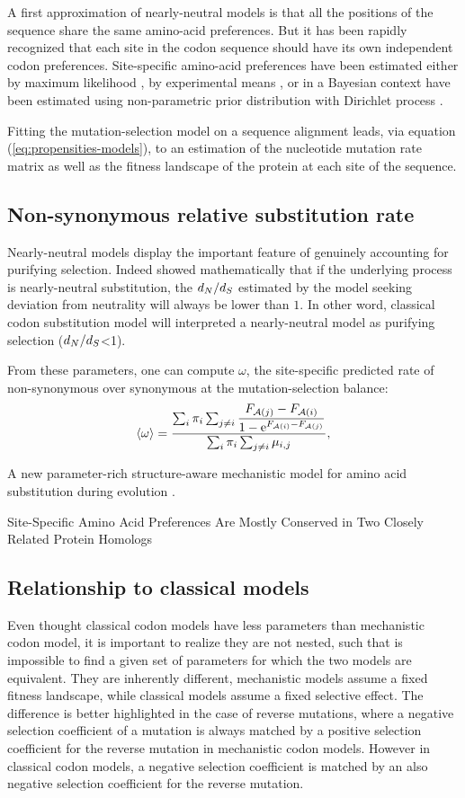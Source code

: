 A first approximation of nearly-neutral models is that all the positions of the sequence share the same amino-acid preferences.
But it has been rapidly recognized that each site in the codon sequence should have its own independent codon preferences.
Site-specific amino-acid preferences have been estimated either by maximum likelihood \citep{Tamuri2012,Tamuri2014}, by experimental means \citep{Bloom2017}, or in a Bayesian context have been estimated using non-parametric
prior distribution with Dirichlet process \citep{Rodrigue2010, Rodrigue2014}.

Fitting the mutation-selection model on a sequence alignment leads, via equation (\ref{eq:propensities-models}), to an estimation of the nucleotide mutation rate matrix as well as the fitness landscape of the protein at each site of the sequence.

\subsection{Non-synonymous relative {substitution} rate}
Nearly-neutral models display the important feature of genuinely accounting for purifying selection.
Indeed \citet{Spielman2015} showed mathematically that if the underlying process is nearly-neutral substitution, the $d_N / d_S$ estimated by the model seeking deviation from neutrality will always be lower than $1$.
In other word, classical codon substitution model will interpreted a nearly-neutral model as purifying selection ($d_N / d_S$<1).

From these parameters, one can compute $\omega$, the site-specific predicted rate of non-synonymous over \gls{synonymous} at the mutation-selection balance: 
\begin{equation}
\langle \omega \rangle = \dfrac{ \sum_{i} \pi_{i} \sum_{j \neq i }  \dfrac{F_{\mathcal{A}({j})} - F_{\mathcal{A}({i})}}{1 - \mathrm{e}^{F_{\mathcal{A}({i})} - F_{\mathcal{A}({j})}} }}{\sum_{i} \pi_{i} \sum_{j \neq i } \mu_{{i}, {j}}},
\end{equation}


A new parameter-rich structure-aware mechanistic model for amino acid \gls{substitution} during evolution \citep{Chi2018}.

Site-Specific Amino Acid Preferences Are Mostly Conserved in Two Closely Related Protein Homologs \citep{Doud2015}

\subsection{Relationship to classical models}
Even thought classical codon models have less parameters than mechanistic codon model, it is important to realize they are not nested, such that is impossible to find a given set of parameters for which the two models are equivalent.
They are inherently different, mechanistic models assume a fixed fitness landscape, while classical models assume a fixed selective effect.
The difference is better highlighted in the case of reverse mutations, where a negative selection coefficient of a mutation is always matched by a positive selection coefficient for the reverse mutation in mechanistic codon models.
However in classical codon models, a negative selection coefficient is matched by an also negative selection coefficient for the reverse mutation.

